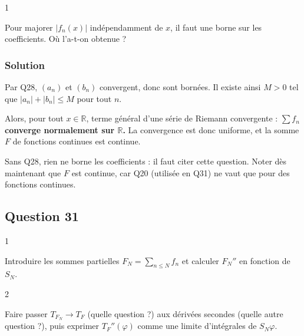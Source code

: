 \documentclass[11pt,a4paper]{article}
\newcommand{\equationajustee}[1]{%
  \sbox{\boiteequation}{$\displaystyle #1$}%
  \ifdim\wd\boiteequation>\linewidth
    \[\resizebox{\linewidth}{!}{\usebox{\boiteequation}}\]%
  \else
    \[#1\]%
  \fi}
\begin{document}
\begin{indication}{1}

Pour majorer \(|f_n(x)|\) indépendamment de \(x\), il faut une borne sur les coefficients. Où l'a-t-on obtenue ?

\end{indication}

\hypertarget{solution-29}{%
\subsubsection{Solution}\label{solution-29}}

Par Q28, \((a_n)\) et \((b_n)\) convergent, donc sont bornées. Il existe ainsi \(M>0\) tel que \(|a_n|+|b_n|\leqslant M\) pour tout \(n\).

Alors, pour tout \(x\in\mathbb R\),
\equationajustee{\begin{aligned}
|f_n(x)|&\leqslant\frac{|a_n|+|b_n|}{n^2}\\
&\leqslant\frac M{n^2},
\end{aligned}}
terme général d'une série de Riemann convergente : \textbf{\(\sum f_n\) converge normalement sur \(\mathbb R\).} La convergence est donc uniforme, et la somme \(F\) de fonctions continues est continue.

\begin{piege}

Sans Q28, rien ne borne les coefficients : il faut citer cette question. Noter dès maintenant que \(F\) est continue, car Q20 (utilisée en Q31) ne vaut que pour des fonctions continues.

\end{piege}

\hypertarget{question-31}{%
\subsection{Question 31}\label{question-31}}

\begin{indication}{1}

Introduire les sommes partielles \(F_N=\sum_{n\leqslant N}f_n\) et calculer \(F_N''\) en fonction de \(S_N\).

\end{indication}

\begin{indication}{2}

Faire passer \(T_{F_N}\to T_F\) (quelle question ?) aux dérivées secondes (quelle autre question ?), puis exprimer \(T_F''(\varphi)\) comme une limite d'intégrales de \(S_N\varphi\).

\end{indication}
\end{document}

